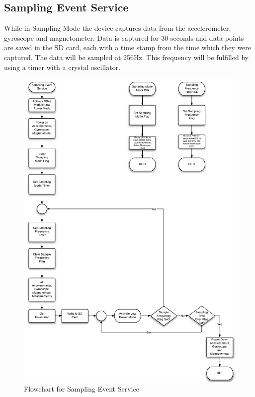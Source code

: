 \subsection{Sampling Event Service}
While in Sampling Mode the device captures data from the accelerometer, gyroscope and magnetometer. Data is captured for 30 seconds and data points are saved in the SD card, each with a time stamp from the time which they were captured. The data will be sampled at 256Hz. This frequency will be fulfilled by using a timer with a crystal oscillator.
\begin{figure}[H]
	\centering
	\includegraphics[scale=0.7]{img/SamplingEventService}
	\caption{Flowchart for Sampling Event Service \label{fig:samplingMode}}
\end{figure}

